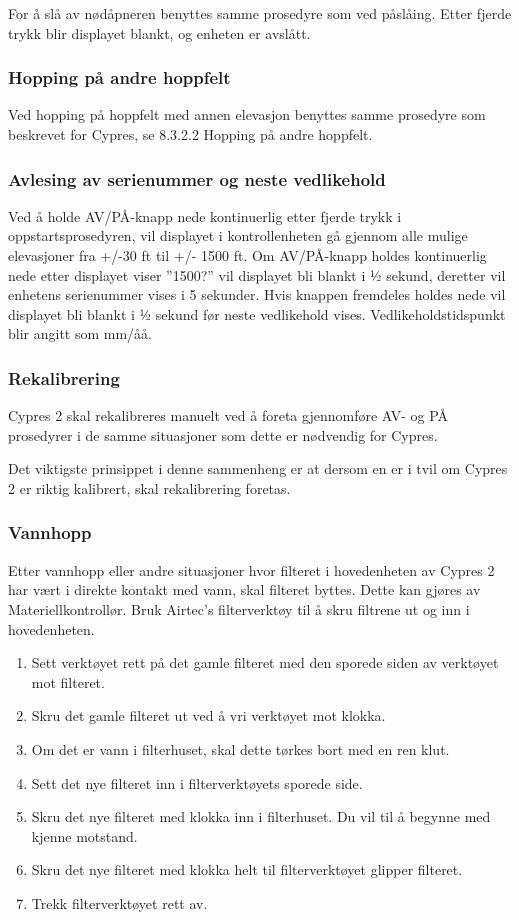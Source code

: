 For å slå av nødåpneren benyttes samme prosedyre som ved påslåing. Etter fjerde trykk blir displayet blankt, og enheten er avslått.

\subsubsection{Hopping på andre hoppfelt}
Ved hopping på hoppfelt med annen elevasjon benyttes samme prosedyre som beskrevet for Cypres, se 8.3.2.2 Hopping på andre hoppfelt.

\subsubsection{Avlesing av serienummer og neste vedlikehold}
Ved å holde AV/PÅ-knapp nede kontinuerlig etter fjerde trykk i oppstartsprosedyren, vil displayet i kontrollenheten gå gjennom alle mulige elevasjoner fra +/-30 ft til +/- 1500 ft. Om AV/PÅ-knapp holdes kontinuerlig nede etter displayet viser ”1500?” vil displayet bli blankt i 1⁄2 sekund, deretter vil enhetens serienummer vises i 5 sekunder. Hvis knappen fremdeles holdes nede vil displayet bli blankt i 1⁄2 sekund før neste vedlikehold vises. Vedlikeholdstidspunkt blir angitt som mm/åå.

\subsubsection{Rekalibrering}
Cypres 2 skal rekalibreres manuelt ved å foreta gjennomføre AV- og PÅ prosedyrer i de samme situasjoner som dette er nødvendig for Cypres.

Det viktigste prinsippet i denne sammenheng er at dersom en er i tvil om Cypres 2 er riktig kalibrert, skal rekalibrering foretas.

\subsubsection{Vannhopp}
Etter vannhopp eller andre situasjoner hvor filteret i hovedenheten av Cypres 2 har vært i direkte kontakt med vann, skal filteret byttes. Dette kan gjøres av Materiellkontrollør. Bruk Airtec’s filterverktøy til å skru filtrene ut og inn i hovedenheten.
\begin{enumerate}
\item Sett verktøyet rett på det gamle filteret med den sporede siden av verktøyet mot filteret.
\item Skru det gamle filteret ut ved å vri verktøyet mot klokka.
\item Om det er vann i filterhuset, skal dette tørkes bort med en ren klut.
\item Sett det nye filteret inn i filterverktøyets sporede side.
\item Skru det nye filteret med klokka inn i filterhuset. Du vil til å begynne med kjenne motstand.
\item Skru det nye filteret med klokka helt til filterverktøyet glipper filteret.
\item Trekk filterverktøyet rett av.
\end{enumerate}

